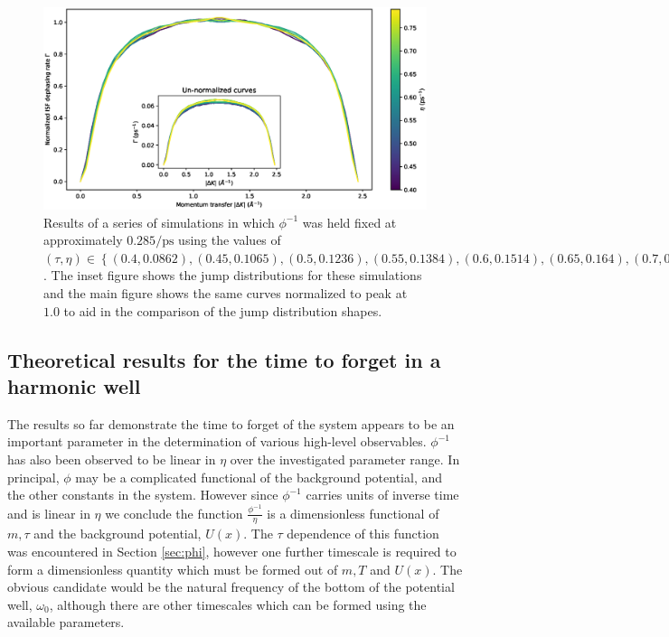 \documentclass{article}
\newcommand{\ips}{\si{\per\pico\second}}
\begin{document}
\begin{figure}
	\centering
	\includegraphics[width=1.0\textwidth]{jump_distributions}
	\caption{Results of a series of simulations in which $\phi^{-1}$ was held fixed at approximately $0.285\ips$ using the values of $(\tau,\eta)\in\left\{(0.4, 0.0862), (0.45, 0.1065), (0.5, 0.1236), (0.55, 0.1384), (0.6, 0.1514), (0.65, 0.164), (0.7, 0.1759), (0.75, 0.1867)\right\}$ . The inset figure shows the jump distributions for these simulations and the main figure shows the same curves normalized to peak at $1.0$ to aid in the comparison of the jump distribution shapes.}
	\label{fig:jump_distributions}
\end{figure}

\subsection{Theoretical results for the time to forget in a harmonic well}

The results so far demonstrate the time to forget of the system appears to be an important parameter in the determination of various high-level observables. $\phi^{-1}$ has also been observed to be linear in $\eta$ over the investigated parameter range. In principal, $\phi$ may be a complicated functional of the background potential, and the other constants in the system. However since $\phi^{-1}$ carries units of inverse time and is linear in $\eta$ we conclude the function $\frac{\phi^{-1}}{\eta}$ is a dimensionless functional of $m, \tau$ and the background potential, $U(x)$. The $\tau$ dependence of this function was encountered in Section \ref{sec:phi}, however one further timescale is required to form a dimensionless quantity which must be formed out of $m, T$ and $U(x)$. The obvious candidate would be the natural frequency of the bottom of the potential well, $\omega_0$, although there are other timescales which can be formed using the available parameters.
\end{document}
